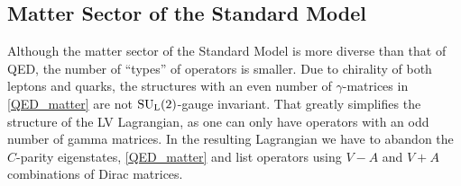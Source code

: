 \documentclass[12pt,preprintnumbers,nofootinbib]{revtex4}
\newcommand{\wt}{\widetilde}
\newcommand{\suc}{{{\rm SU}_{\rm C}(3)}}
\newcommand{\sul}{{{\rm SU}_{\rm L}(2)}}
\begin{document}


\subsection{Matter Sector of the Standard Model}
\label{matter_SM}
	Although the matter sector of the Standard Model is more diverse
	than that of QED, the number of ``types'' of operators is smaller.
	Due to chirality of both leptons and quarks, the structures 
	with an even number of $ \gamma $-matrices in \eqref{QED_matter}
	are not $ \sul $-gauge invariant. 
	That greatly simplifies the structure of the LV Lagrangian,
	as one can only have operators with an odd number of gamma
	matrices.
	In the resulting Lagrangian we have to abandon the $C$-parity eigenstates, 
    \eqref{QED_matter} and list operators using $V-A$ and $V+A$ combinations of Dirac matrices. 
	
\end{document}
